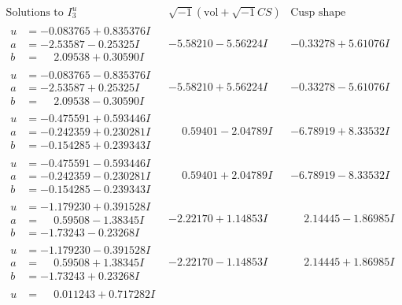\documentclass[1p]{elsarticle_modified}
\theoremstyle{definition}
\newcommand{\I}{\sqrt{-1}}
\begin{document}
$$\begin{array}{c|c|c}  
\text{Solutions to }I^u_{3}& \I (\text{vol} + \sqrt{-1}CS) & \text{Cusp shape}\\
 \hline 
\begin{aligned}
u &= -0.083765 + 0.835376 I \\
a &= -2.53587 - 0.25325 I \\
b &= \phantom{-}2.09538 + 0.30590 I\end{aligned}
 & -5.58210 - 5.56224 I & -0.33278 + 5.61076 I \\ \hline\begin{aligned}
u &= -0.083765 - 0.835376 I \\
a &= -2.53587 + 0.25325 I \\
b &= \phantom{-}2.09538 - 0.30590 I\end{aligned}
 & -5.58210 + 5.56224 I & -0.33278 - 5.61076 I \\ \hline\begin{aligned}
u &= -0.475591 + 0.593446 I \\
a &= -0.242359 + 0.230281 I \\
b &= -0.154285 + 0.239343 I\end{aligned}
 & \phantom{-}0.59401 - 2.04789 I & -6.78919 + 8.33532 I \\ \hline\begin{aligned}
u &= -0.475591 - 0.593446 I \\
a &= -0.242359 - 0.230281 I \\
b &= -0.154285 - 0.239343 I\end{aligned}
 & \phantom{-}0.59401 + 2.04789 I & -6.78919 - 8.33532 I \\ \hline\begin{aligned}
u &= -1.179230 + 0.391528 I \\
a &= \phantom{-}0.59508 - 1.38345 I \\
b &= -1.73243 - 0.23268 I\end{aligned}
 & -2.22170 + 1.14853 I & \phantom{-}2.14445 - 1.86985 I \\ \hline\begin{aligned}
u &= -1.179230 - 0.391528 I \\
a &= \phantom{-}0.59508 + 1.38345 I \\
b &= -1.73243 + 0.23268 I\end{aligned}
 & -2.22170 - 1.14853 I & \phantom{-}2.14445 + 1.86985 I \\ \hline\begin{aligned}
u &= \phantom{-}0.011243 + 0.717282 I \\

\end{aligned}
\end{array}$$
\end{document}
